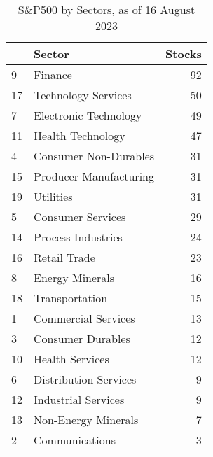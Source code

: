 \documentclass[
  letterpaper,
  DIV=11,
  numbers=noendperiod]{scrreport}
\newenvironment{Shaded}{\begin{snugshade}}{\end{snugshade}}
\newcommand{\AttributeTok}[1]{\textcolor[rgb]{0.40,0.45,0.13}{#1}}
\newcommand{\CommentTok}[1]{\textcolor[rgb]{0.37,0.37,0.37}{#1}}
\newcommand{\FunctionTok}[1]{\textcolor[rgb]{0.28,0.35,0.67}{#1}}
\newcommand{\NormalTok}[1]{\textcolor[rgb]{0.00,0.23,0.31}{#1}}
\newcommand{\OtherTok}[1]{\textcolor[rgb]{0.00,0.23,0.31}{#1}}
\newcommand{\SpecialCharTok}[1]{\textcolor[rgb]{0.37,0.37,0.37}{#1}}
\newcommand{\StringTok}[1]{\textcolor[rgb]{0.13,0.47,0.30}{#1}}
\begin{document}
\begin{Shaded}
\end{Shaded}

\begin{table}

\caption{S&P500 by Sectors, as of 16 August 2023}
\centering
\begin{tabular}[t]{l|l|r}
\hline
  & Sector & Stocks\\
\hline
9 & Finance & 92\\
\hline
17 & Technology Services & 50\\
\hline
7 & Electronic Technology & 49\\
\hline
11 & Health Technology & 47\\
\hline
4 & Consumer Non-Durables & 31\\
\hline
15 & Producer Manufacturing & 31\\
\hline
19 & Utilities & 31\\
\hline
5 & Consumer Services & 29\\
\hline
14 & Process Industries & 24\\
\hline
16 & Retail Trade & 23\\
\hline
8 & Energy Minerals & 16\\
\hline
18 & Transportation & 15\\
\hline
1 & Commercial Services & 13\\
\hline
3 & Consumer Durables & 12\\
\hline
10 & Health Services & 12\\
\hline
6 & Distribution Services & 9\\
\hline
12 & Industrial Services & 9\\
\hline
13 & Non-Energy Minerals & 7\\
\hline
2 & Communications & 3\\
\hline
\end{tabular}
\end{table}
\end{document}
